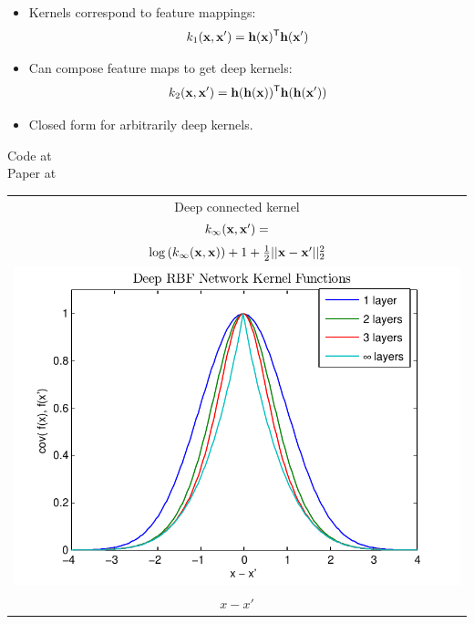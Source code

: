 \documentclass[portrait,a0b,final,a4resizeable]{include/a0poster}
\newcommand{\feat}{\vh}
\begin{document}
\begin{poster}
\begin{multicols}{2}
\vspace*{-1cm}
\begin{minipage}[c]{0.6\columnwidth}
\begin{itemize}
\item Kernels correspond to feature mappings:
$${k_1(\vx, \vx') = \feat(\vx) \tra \feat(\vx')}$$
\item Can compose feature maps to get deep kernels:
$${k_2(\vx, \vx') = \feat(\feat(\vx)) \tra \feat(\feat(\vx'))}$$
\item Closed form for arbitrarily deep kernels.
\end{itemize}

Code at {}\\
Paper at {}

\end{minipage}
\begin{minipage}[c]{0.39\columnwidth}
\begin{centering}
\begin{tabular}{c}
Deep connected kernel \\
$k_\infty(\mathbf{x}, \mathbf{x}') = $ \\ $\log \left(k_\infty(\mathbf{x}, \mathbf{x}) \right) + 1 + \frac{1}{2} || \mathbf{x} - \mathbf{x}' ||_2^2$ \\[0.5cm]
\hspace{-0.5cm}\includegraphics[width=\columnwidth, clip, trim = 0cm 0.4cm 0.9cm 0.3cm]{../figures/deep_kernel_connected} \\
$x - x'$
\end{tabular}
\end{centering}
\end{minipage}

\end{multicols}
\end{poster}
\end{document}
